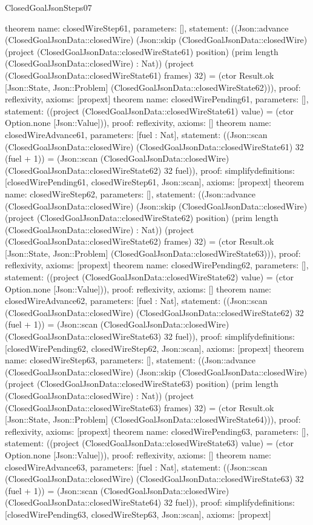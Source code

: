 \begin{lexlean}{ClosedGoalJsonSteps07}
\begin{semanticmodule}
{}
theorem{
 name: closedWireStep61, parameters: [],
 statement: ((Json::advance (ClosedGoalJsonData::closedWire) (Json::skip (ClosedGoalJsonData::closedWire) (project (ClosedGoalJsonData::closedWireState61) position) (prim length (ClosedGoalJsonData::closedWire) : Nat)) (project (ClosedGoalJsonData::closedWireState61) frames) 32) = (ctor Result.ok [Json::State, Json::Problem] (ClosedGoalJsonData::closedWireState62))), proof: reflexivity{}, axioms: [propext]
}
theorem{
 name: closedWirePending61, parameters: [],
 statement: ((project (ClosedGoalJsonData::closedWireState61) value) = (ctor Option.none [Json::Value])), proof: reflexivity{}, axioms: []
}
theorem{
 name: closedWireAdvance61, parameters: [fuel : Nat],
 statement: ((Json::scan (ClosedGoalJsonData::closedWire) (ClosedGoalJsonData::closedWireState61) 32 (fuel + 1)) = (Json::scan (ClosedGoalJsonData::closedWire) (ClosedGoalJsonData::closedWireState62) 32 fuel)), proof: simplify{definitions: [closedWirePending61, closedWireStep61, Json::scan]}, axioms: [propext]
}
theorem{
 name: closedWireStep62, parameters: [],
 statement: ((Json::advance (ClosedGoalJsonData::closedWire) (Json::skip (ClosedGoalJsonData::closedWire) (project (ClosedGoalJsonData::closedWireState62) position) (prim length (ClosedGoalJsonData::closedWire) : Nat)) (project (ClosedGoalJsonData::closedWireState62) frames) 32) = (ctor Result.ok [Json::State, Json::Problem] (ClosedGoalJsonData::closedWireState63))), proof: reflexivity{}, axioms: [propext]
}
theorem{
 name: closedWirePending62, parameters: [],
 statement: ((project (ClosedGoalJsonData::closedWireState62) value) = (ctor Option.none [Json::Value])), proof: reflexivity{}, axioms: []
}
theorem{
 name: closedWireAdvance62, parameters: [fuel : Nat],
 statement: ((Json::scan (ClosedGoalJsonData::closedWire) (ClosedGoalJsonData::closedWireState62) 32 (fuel + 1)) = (Json::scan (ClosedGoalJsonData::closedWire) (ClosedGoalJsonData::closedWireState63) 32 fuel)), proof: simplify{definitions: [closedWirePending62, closedWireStep62, Json::scan]}, axioms: [propext]
}
theorem{
 name: closedWireStep63, parameters: [],
 statement: ((Json::advance (ClosedGoalJsonData::closedWire) (Json::skip (ClosedGoalJsonData::closedWire) (project (ClosedGoalJsonData::closedWireState63) position) (prim length (ClosedGoalJsonData::closedWire) : Nat)) (project (ClosedGoalJsonData::closedWireState63) frames) 32) = (ctor Result.ok [Json::State, Json::Problem] (ClosedGoalJsonData::closedWireState64))), proof: reflexivity{}, axioms: [propext]
}
theorem{
 name: closedWirePending63, parameters: [],
 statement: ((project (ClosedGoalJsonData::closedWireState63) value) = (ctor Option.none [Json::Value])), proof: reflexivity{}, axioms: []
}
theorem{
 name: closedWireAdvance63, parameters: [fuel : Nat],
 statement: ((Json::scan (ClosedGoalJsonData::closedWire) (ClosedGoalJsonData::closedWireState63) 32 (fuel + 1)) = (Json::scan (ClosedGoalJsonData::closedWire) (ClosedGoalJsonData::closedWireState64) 32 fuel)), proof: simplify{definitions: [closedWirePending63, closedWireStep63, Json::scan]}, axioms: [propext]
}
\end{semanticmodule}
\end{lexlean}
